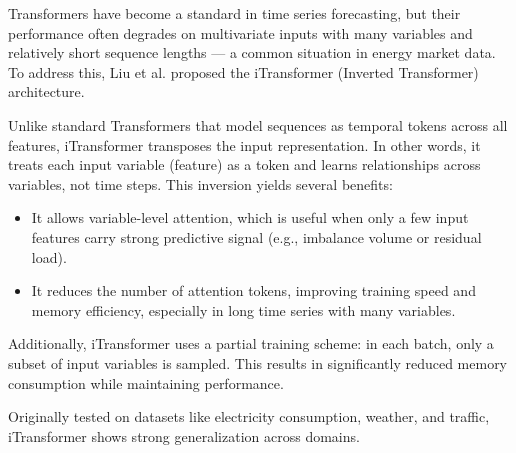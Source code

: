 \documentclass[class=scrbook, crop=false]{standalone}
\begin{document}
Transformers have become a standard in time series forecasting, but their performance often degrades on multivariate inputs with many variables and relatively short sequence lengths — a common situation in energy market data. To address this, Liu et al. \cite{liuITransformerInvertedTransformers2023} proposed the iTransformer (Inverted Transformer) architecture.

Unlike standard Transformers that model sequences as temporal tokens across all features, iTransformer transposes the input representation. In other words, it treats each input variable (feature) as a token and learns relationships across variables, not time steps. This inversion yields several benefits:

\begin{itemize}
\item It allows variable-level attention, which is useful when only a few input features carry strong predictive signal (e.g., imbalance volume or residual load).
\item It reduces the number of attention tokens, improving training speed and memory efficiency, especially in long time series with many variables.
\end{itemize}

Additionally, iTransformer uses a partial training scheme: in each batch, only a subset of input variables is sampled. This results in significantly reduced memory consumption while maintaining performance.

Originally tested on datasets like electricity consumption, weather, and traffic, iTransformer shows strong generalization across domains. 


 
\end{document}
